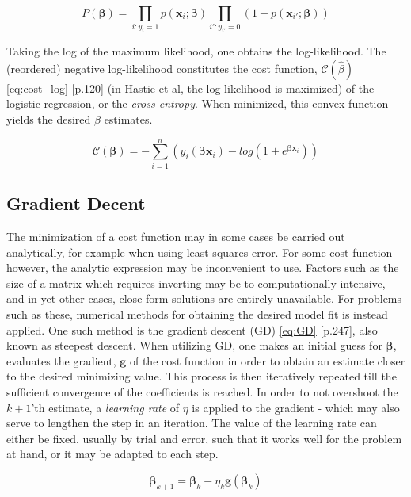 \documentclass[%
oneside,                 %
final,                   %
10pt]{article}
\begin{document}
\begin{equation}
P(\bm{\beta})=\displaystyle\prod_{i:y_i=1}p(\bm{x}_i; \bm{\beta}) \displaystyle\prod_{i':y_{i'}=0}(1-p(\bm{x}_{i'}; \bm{\beta}))
\label{eq:max_likelihood}
\end{equation}

Taking the log of the maximum likelihood, one obtains the log-likelihood. The (reordered) negative log-likelihood constitutes the cost function, $\mathcal{C}(\hat {{\beta}})$ \eqref{eq:cost_log} \citep{HastieTrevor2009TEoS}[p.120] (in Hastie et al, the log-likelihood is maximized) of the logistic regression, or the \textit{cross entropy}. When minimized, this convex function yields the desired $\beta$ estimates.

\begin{equation}
\mathcal{C}(\bm{\beta})=-\sum_{i=1}^n \left(y_i({\bm{\beta}}\bm{x}_i)-log(1+e^{{\bm{\beta}}\bm{x}_i})\right)
\label{eq:cost_log}
\end{equation}

\subsection{Gradient Decent}  \label{Section_M_GD}
The minimization of a cost function may in some cases be carried out analytically, for example when using least squares error. For some cost function however, the analytic expression may be inconvenient to use. Factors such as the size of a matrix which requires inverting may be to computationally intensive, and in yet other cases, close form solutions are entirely unavailable. For problems such as these, numerical methods for obtaining the desired model fit is instead applied. One such method is the gradient descent (GD) \eqref{eq:GD} \citep{MLMurphy}[p.247], also known as steepest descent. When utilizing GD, one makes an initial guess for $\bm{\beta}$, evaluates the gradient, $\bm g$ of the cost function in order to obtain an estimate closer to the desired minimizing value. This process is then iteratively repeated till the sufficient convergence of the coefficients is reached. In order to not overshoot the $k+1$'th estimate, a \textit{learning rate} of $\eta$ is applied to the gradient - which may also serve to lengthen the step in an iteration. The value of the learning rate can either be fixed, usually by trial and error, such that it works well for the problem at hand, or it may be adapted to each step. 

\begin{equation}
\bm{\beta}_{k+1}=\bm{\beta}_{k}-\eta_k  \bm g (\bm{\beta}_k)
\label{eq:GD}
\end{equation}
\end{document}
